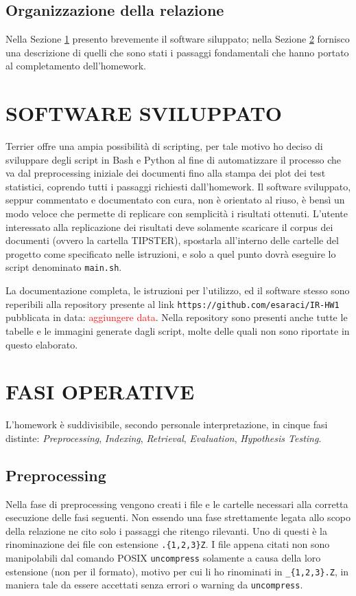 \documentclass[letterpaper, 10 pt, conference]{ieeeconf}  %
\newcommand\todo[1]{\textcolor{red}{#1}}
\begin{document}
\subsection{Organizzazione della relazione}
Nella Sezione \ref{sec:sw} presento brevemente il software siluppato; nella Sezione \ref{sec:devops} fornisco una descrizione di quelli che sono stati i passaggi fondamentali che hanno portato al completamento dell'homework.

\section{SOFTWARE SVILUPPATO}\label{sec:sw}

Terrier offre una ampia possibilità di scripting, per tale motivo ho deciso di sviluppare degli script in Bash e Python al fine di automatizzare il processo che va dal preprocessing iniziale dei documenti fino alla stampa dei plot dei test statistici, coprendo tutti i passaggi richiesti dall'homework.
Il software sviluppato, seppur commentato e documentato con cura, non è orientato al riuso, è bensì un modo veloce che permette di replicare con semplicità i risultati ottenuti.
L'utente interessato alla replicazione dei risultati deve solamente scaricare il corpus dei documenti (ovvero la cartella TIPSTER), spostarla all'interno delle cartelle del progetto come specificato nelle istruzioni, e solo a quel punto dovrà eseguire lo script denominato \texttt{main.sh}.

La documentazione completa, le istruzioni per l'utilizzo, ed il software stesso sono reperibili alla repository presente al link \texttt{https://github.com/esaraci/IR-HW1} pubblicata in data: \todo{aggiungere data}. Nella repository sono presenti anche tutte le tabelle e le immagini generate dagli script, molte delle quali non sono riportate in questo elaborato.

\section{FASI OPERATIVE}\label{sec:devops}
L'homework è suddivisibile, secondo personale interpretazione, in cinque fasi distinte: \textit{Preprocessing}, \textit{Indexing}, \textit{Retrieval}, \textit{Evaluation}, \textit{Hypothesis Testing}.
\subsection{Preprocessing}
Nella fase di preprocessing vengono creati i file e le cartelle necessari alla corretta esecuzione delle fasi seguenti. Non essendo una fase strettamente legata allo scopo della relazione ne cito solo i passaggi che ritengo rilevanti. Uno di questi è la rinominazione dei file con estensione \texttt{.\{1,2,3\}Z}. I file appena citati non sono manipolabili dal comando POSIX \texttt{uncompress} solamente a causa della loro estensione (non per il formato), motivo per cui li ho rinominati in \texttt{\_\{1,2,3\}.Z}, in maniera tale da essere accettati senza errori o warning da \texttt{uncompress}.
\end{document}
